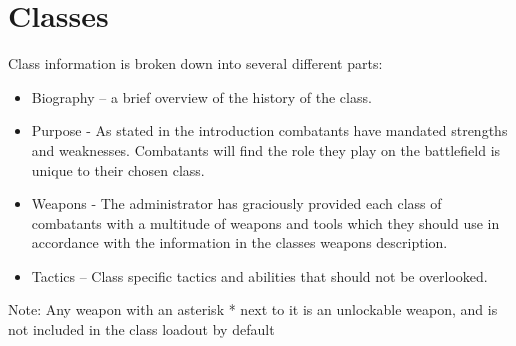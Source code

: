 \section{Classes}

Class information is broken down into several different parts:
\begin{itemize}
	\item Biography – a brief overview of the history of the class.
	\item Purpose - As stated in the introduction combatants have mandated strengths and weaknesses.  Combatants will find the role they play on the battlefield is unique to  their chosen class. 
	\item Weapons - The administrator has graciously provided each class of combatants with a multitude of weapons and tools which they should use in accordance with the information in the classes weapons description. 
	\item Tactics – Class specific tactics and abilities that should not be overlooked.
\end{itemize}
Note: Any weapon with an asterisk * next to it is an unlockable weapon, and is not included in the class loadout by default

\newpage


\newpage


\newpage


\newpage


\newpage


\newpage


\newpage


\newpage


\newpage


\newpage
